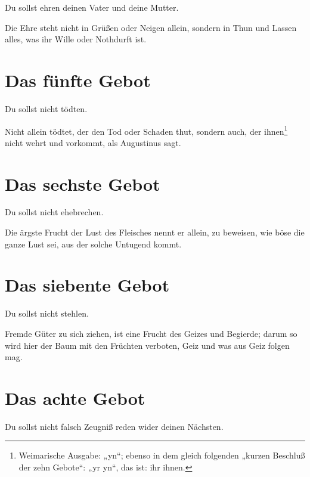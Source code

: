 \begin{schriftzitat}
Du sollst ehren deinen Vater und deine Mutter.
\end{schriftzitat}

Die Ehre steht nicht in Grüßen oder Neigen allein, sondern in Thun und Lassen alles, was ihr Wille oder Nothdurft ist.

\section{Das fünfte Gebot}

\begin{schriftzitat}
Du sollst nicht tödten.
\end{schriftzitat}

Nicht allein tödtet, der den Tod oder Schaden thut, sondern auch, der ihnen\footnote{Weimarische Ausgabe: „yn“; ebenso in dem gleich folgenden „kurzen Beschluß der zehn Gebote“: „yr yn“, das ist: ihr ihnen.} nicht wehrt und vorkommt, als Augustinus sagt.

\section{Das sechste Gebot}

\begin{schriftzitat}
Du sollst nicht ehebrechen.
\end{schriftzitat}

Die ärgste Frucht der Lust des Fleisches nennt er allein, zu beweisen, wie böse die ganze Lust sei, aus der solche Untugend kommt.

\section{Das siebente Gebot}

\begin{schriftzitat}
Du sollst nicht stehlen.
\end{schriftzitat}

Fremde Güter zu sich ziehen, ist eine Frucht des Geizes und Begierde; darum so wird hier der Baum mit den Früchten verboten, Geiz und was aus Geiz folgen mag.

\section{Das achte Gebot}

\begin{schriftzitat}
Du sollst nicht falsch Zeugniß reden wider deinen Nächsten.
\end{schriftzitat}

